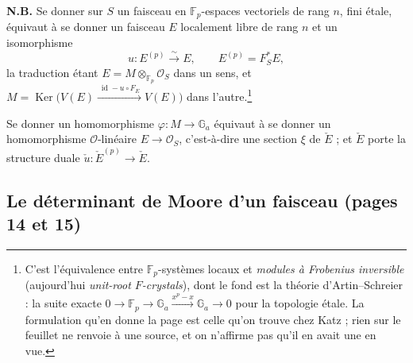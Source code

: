 \documentclass[11pt,a4paper]{article}
\begin{document}
\textbf{N.B.} Se donner sur $S$ un faisceau en $\mathbb{F}_p$-espaces
vectoriels de rang $n$, fini étale, équivaut à se donner un faisceau $E$
localement libre de rang $n$ et un isomorphisme
\[
  u : E^{(p)} \xrightarrow{\ \sim\ } E , \qquad E^{(p)} = F_S^* E ,
\]
la traduction étant $E = M \otimes_{\mathbb{F}_p} \mathcal{O}_S$ dans un
sens, et
$M = \operatorname{Ker}\bigl(V(E) \xrightarrow{\ \operatorname{id} -
u \circ F_E\ } V(E)\bigr)$ dans l'autre.\footnote{C'est l'équivalence entre
$\mathbb{F}_p$-systèmes locaux et \emph{modules à Frobenius inversible}
(aujourd'hui \emph{unit-root $F$-crystals}), dont le fond est la théorie
d'Artin--Schreier : la suite exacte
$0 \to \mathbb{F}_p \to \mathbb{G}_a \xrightarrow{x^p - x} \mathbb{G}_a \to
0$ pour la topologie étale. La formulation qu'en donne la page est celle
qu'on trouve chez Katz ; rien sur le feuillet ne renvoie à une source, et on
n'affirme pas qu'il en avait une en vue.}

Se donner un homomorphisme $\varphi : M \to \mathbb{G}_a$ équivaut à se
donner un homomorphisme $\mathcal{O}$-linéaire $E \to \mathcal{O}_S$,
c'est-à-dire une section $\xi$ de $\check{E}$ ; et $\check{E}$ porte la
structure duale $\check{u} : \check{E}^{(p)} \to \check{E}$.

\subsection*{Le déterminant de Moore d'un faisceau (pages 14 et 15)}
\end{document}
